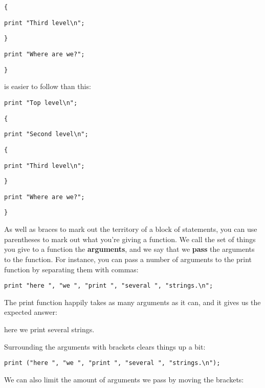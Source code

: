 \documentclass[a4paper,12pt,twoside]{book}
\begin{document}
\noindent \texttt{\{}

\noindent \texttt{print "Third level\textbackslash n";}

\noindent \texttt{\}}

\noindent \texttt{print "Where are we?";}

\noindent \texttt{\}}

\noindent 

\noindent is easier to follow than this:

\noindent 

\noindent \texttt{print "Top level\textbackslash n";}

\noindent \texttt{\{}

\noindent \texttt{print "Second level\textbackslash n";}

\noindent \texttt{\{}

\noindent \texttt{print "Third level\textbackslash n";}

\noindent \texttt{\}}

\noindent \texttt{print "Where are we?";}

\noindent \texttt{\}}

\noindent 

\noindent As well as braces to mark out the territory of a block of statements, you can use parentheses to mark out what you're giving a function. We call the set of things you give to a function the \textbf{arguments}, and we say that we \textbf{pass }the arguments to the function. For instance, you can pass a number of arguments to the print function by separating them with commas:

\noindent 

\noindent \texttt{print "here ", "we ", "print ", "several ", "strings.\textbackslash n";}

\noindent 

\noindent The print function happily takes as many arguments as it can, and it gives us the expected answer:

\noindent 

\noindent here we print several strings.

\noindent 

\noindent Surrounding the arguments with brackets clears things up a bit:

\noindent 

\noindent \texttt{print ("here ", "we ", "print ", "several ", "strings.\textbackslash n");}

\noindent 

\noindent We can also limit the amount of arguments we pass by moving the brackets:
\end{document}
